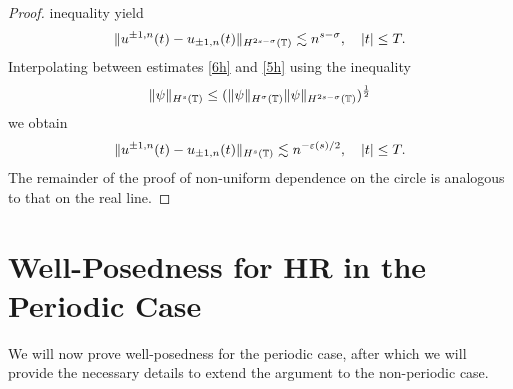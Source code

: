 \begin{proof}
inequality yield
%
%
\begin{equation}
\begin{split}
\|u^{\pm 1, n} (t) - u_{\pm 1, n}(t)\|_{H^{2s - \sigma}(\mathbb{T})}
\lesssim n^{s-\sigma}, \quad |t| \le T.
\label{5h}
\end{split}
\end{equation}
%
%
%
%
Interpolating between estimates \eqref{6h} and \eqref{5h} using the 
inequality
%
\begin{equation*}
\|\psi \|_{H^s (\mathbb{T})} \leq  (\| \psi \|_{H^\sigma (\mathbb{T})} \| \psi
\|_{H^{2s-\sigma}(\mathbb{T})})^\frac12
\end{equation*}
%
%
we obtain
%
%
\begin{equation}
\begin{split}
\|u^{\pm 1,n}(t) - u_{\pm 1, n}(t) \|_{H^s (\mathbb{T})} \lesssim
n^{-\varepsilon(s)/2}, \quad |t| \le T.
\label{10h}
\end{split}
\end{equation}
%
%
The remainder of the proof of non-uniform dependence on the circle is
analogous to that on the real line. 
\end{proof}
%
%
%
%
%
\section{Well-Posedness for HR in the Periodic Case}
%
%
%
%
We will now prove well-posedness for the periodic case, after which we will
provide the necessary details to extend the argument to the non-periodic case.
